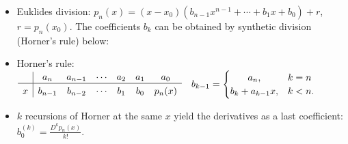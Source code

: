 \documentclass[a4paper]{article}
\begin{document}
\begin{itemize}
  \item Euklides division: $p_n(x)=(x-x_0)(b_{n-1}x^{n-1}+\cdots+b_1x+b_0)+r$,\; $r=p_n(x_0)$.
    The coefficients $b_k$ can be obtained by synthetic division (Horner's rule) below:
  \item Horner's rule:\;
 $
 \begin{array}{c|*{6}{c}}
    & a_n     & a_{n-1} & \cdots & a_2& a_1& a_0 \\ \hline
   \rule[0pt]{0pt}{11pt}
   x& b_{n-1} & b_{n-2} & \cdots & b_1& b_0& p_n(x) \\
 \end{array}
 \quad
    b_{k-1}
    =
    \begin{cases}
      \hfil a_n ,& k=n \\
      b_{k} + a_{k-1}x ,& k < n.\\
    \end{cases}
 $

\item $k$ recursions of Horner at the same $x$
 yield the derivatives as a last coefficient:
 $b_0^{(k)}=\frac{D^kp_n(x)}{k!}$.


\end{itemize}%
\end{document}
